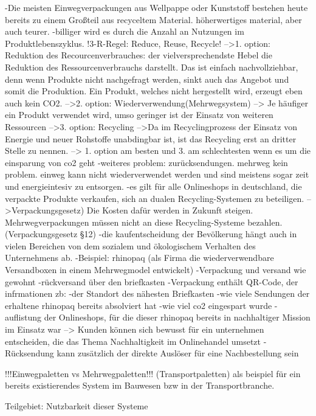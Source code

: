     -Die meisten Einwegverpackungen aus Wellpappe oder Kunststoff bestehen heute bereits zu einem Großteil aus recyceltem Material. höherwertiges material, aber auch teurer. 
    -billiger wird es durch die Anzahl an Nutzungen im Produktlebenszyklus. 
    !3-R-Regel: Reduce, Reuse, Recycle! 
        –>1. option: Reduktion des Recourcenverbrauches: 
            der vielversprechendste Hebel die Reduktion des Ressourcenverbrauchs darstellt. Das ist einfach nachvollziehbar, denn wenn Produkte nicht nachgefragt werden, sinkt auch das Angebot und somit die Produktion. Ein Produkt, welches nicht hergestellt wird, erzeugt eben auch kein CO2. 
        –>2. option: Wiederverwendung(Mehrwegsystem) 
            –> Je häufiger ein Produkt verwendet wird, umso geringer ist der Einsatz von weiteren Ressourcen 
        –>3. option: Recycling –>Da im Recyclingprozess der Einsatz von Energie und neuer Rohstoffe unabdingbar ist, ist das Recycling erst an dritter Stelle zu nennen. 
        –> 1. option am besten und 3. am schlechtesten wenn es um die einsparung von co2 geht -weiteres problem: 
            zurücksendungen. mehrweg kein problem. einweg kann nicht wiederverwendet werden und sind meistens sogar zeit und energieintesiv zu entsorgen. 
            -es gilt für alle Onlineshops in deutschland, die verpackte Produkte verkaufen, sich an dualen Recycling-Systemen zu beteiligen. –>Verpackungsgesetz)
            Die Kosten dafür werden in Zukunft steigen. Mehrwegverpackungen müssen nicht an diese Recycling-Systeme bezahlen.(Verpackungsgesetz §12) 
            -die kaufentscheidung der Bevölkerung hängt auch in vielen Bereichen von dem sozialem und ökologischem Verhalten des Unternehmens ab. 
                -Beispiel: rhinopaq (als Firma die wiederverwendbare Versandboxen in einem Mehrwegmodel entwickelt) 
            -Verpackung und versand wie gewohnt 
            -rückversand über den briefkasten 
            -Verpackung enthält QR-Code, der infrmationen zb: 
                -der Standort des nähesten Briefkasten 
                -wie viele Sendungen der erhaltene rhinopaq bereits absolviert hat 
                -wie viel co2 eingespart wurde 
                -auflistung der Onlineshops, für die dieser rhinopaq bereits in nachhaltiger Mission im Einsatz war 
                –> Kunden können sich bewusst für ein unternehmen entscheiden, die das Thema Nachhaltigkeit im Onlinehandel umsetzt  
                -Rücksendung kann zusätzlich der direkte Auslöser für eine Nachbestellung sein
                
        !!!Einwegpaletten vs Mehrwegpaletten!!! (Transportpaletten) als beispiel für ein bereits existierendes System im Bauwesen bzw in der Transportbranche.
        
    Teilgebiet: Nutzbarkeit dieser Systeme